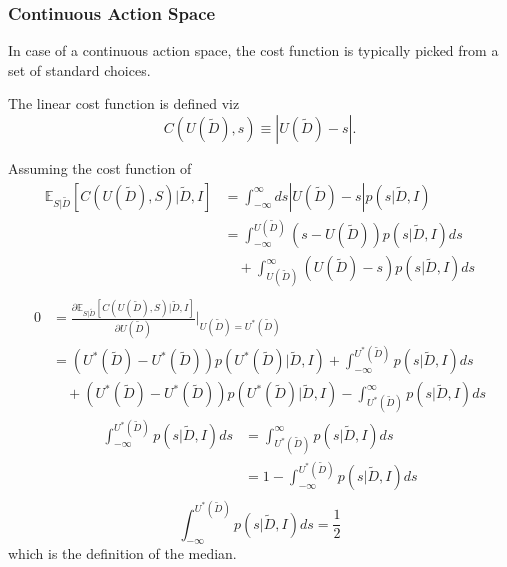 \subsubsection{Continuous Action Space}
In case of a continuous action space, the cost function is typically picked from a set of standard choices.	
\begin{definition}
	\label{def:linear_cost_function}
	The linear cost function is defined viz
	\begin{equation}
		C(U(\tilde{D}),s) \equiv |U(\tilde{D})-s|.
	\end{equation}
	
\end{definition}
\begin{theorem}
	\label{def:median_decision_rule}
	Assuming the cost function of 
	\begin{equation}
		\begin{split}
			\mathbb{E}_{S|\tilde{D}}[C(U(\tilde{D}), S)|\tilde{D},I] &= \int_{-\infty}^{\infty} ds |U(\tilde{D})-s| p(s|\tilde{D},I)\\
			&= \int_{-\infty}^{U(\tilde{D})} (s-U(\tilde{D}))p(s|\tilde{D},I)ds\\
			&\quad+\int_{U(\tilde{D})}^\infty (U(\tilde{D})-s)p(s|\tilde{D},I)ds\\
		\end{split}
	\end{equation}
	\begin{equation}
		\begin{split}
			0 &=\frac{\partial \mathbb{E}_{S|\tilde{D}}[C(U(\tilde{D}), S)|\tilde{D},I]}{\partial U(\tilde{D})}\bigg|_{U(\tilde{D})=U^*(\tilde{D})}\\
			&= (U^*(\tilde{D})-U^*(\tilde{D}))p(U^*(\tilde{D})|\tilde{D},I)+\int_{-\infty}^{U^*(\tilde{D})} p(s|\tilde{D},I)ds\\
			&\quad+(U^*(\tilde{D})-U^*(\tilde{D}))p(U^*(\tilde{D})|\tilde{D},I)-\int_{U^*(\tilde{D})}^\infty p(s|\tilde{D},I)ds
		\end{split}
	\end{equation}
	\begin{equation}
		\begin{split}
			\int_{-\infty}^{U^*(\tilde{D})} p(s|\tilde{D},I)ds &= \int_{U^*(\tilde{D})}^\infty p(s|\tilde{D},I)ds\\
			&= 1- \int_{-\infty}^{U^*(\tilde{D})} p(s|\tilde{D},I)ds\\
		\end{split}
	\end{equation}
	\begin{equation}
		\int_{-\infty}^{U^*(\tilde{D})} p(s|\tilde{D},I)ds = \frac{1}{2}
	\end{equation}
	which is the definition of the median.
\end{theorem}

